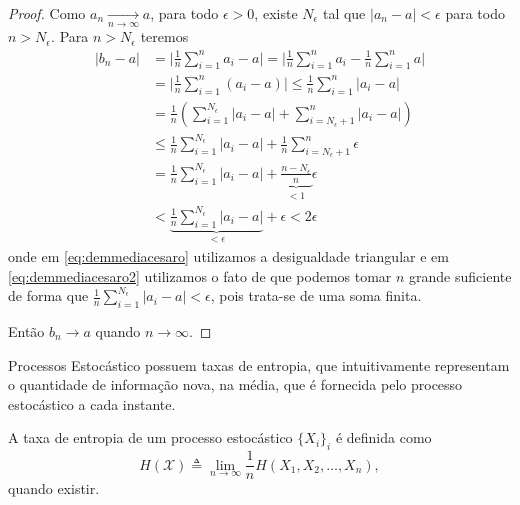 \begin{proof}
  Como $a_n \xrightarrow[ n \rightarrow \infty ]{ } a$, para todo $\epsilon > 0$, existe $N_{\epsilon}$ tal que $\vert a_n - a \vert < \epsilon$
  para todo $n > N_{\epsilon}$.
  Para $n > N_{\epsilon}$ teremos
  \begin{subequations}
  \begin{align}
    \vert b_n - a \vert &= \vert \frac{1}{n} \sum_{i=1}^n a_i - a \vert = \vert \frac{1}{n} \sum_{i=1}^n a_i - \frac{1}{n} \sum_{i=1}^n a \vert \\
                        &= \vert \frac{1}{n} \sum_{i=1}^n (a_i - a) \vert  \leq  \frac{1}{n} \sum_{i=1}^n \vert a_i - a \vert \label{eq:demmediacesaro}\\
                        &= \frac{1}{n} \left( \sum_{i=1}^{N_{\epsilon}} \vert a_i - a \vert + \sum_{i=N_{\epsilon}+1}^n \vert a_i - a \vert \right) \\
                        &\leq \frac{1}{n} \sum_{i=1}^{N_{\epsilon}} \vert a_i - a \vert + \frac{1}{n}  \sum_{i=N_{\epsilon}+1}^n \epsilon \\
                &= \frac{1}{n} \sum_{i=1}^{N_{\epsilon}} \vert a_i - a \vert + \underbrace{\frac{n - N_{\epsilon}}{n}}_{<1} \epsilon \\
                &< \underbrace{ \frac{1}{n} \sum_{i=1}^{N_{\epsilon}} \vert a_i - a \vert }_{< \epsilon } + \epsilon < 2\epsilon \label{eq:demmediacesaro2}
  \end{align}
  \end{subequations}
  onde em \ref{eq:demmediacesaro} utilizamos a desigualdade triangular e em \ref{eq:demmediacesaro2}
  utilizamos o fato de que podemos tomar $n$ grande suficiente de forma que 
  $\frac{1}{n} \sum_{i=1}^{N_{\epsilon}} \vert a_i - a \vert < \epsilon$,
  pois trata-se de uma soma finita.

  Então $b_n \rightarrow a$ quando $n \rightarrow \infty$.
\end{proof}


Processos Estocástico possuem taxas de entropia, que intuitivamente representam o
quantidade de informação nova, na média, que é fornecida pelo processo estocástico a
cada instante.

\begin{definition}
  A taxa de entropia de um processo estocástico $\{ X_i \}_i$ é definida como
  \begin{equation}\label{eq:txentropia}
    H(\mathcal{X}) \triangleq \lim_{n \rightarrow \infty} \frac{1}{n} H(X_1, X_2, \ldots, X_n) , 
    \end{equation}
quando existir.
\end{definition}

